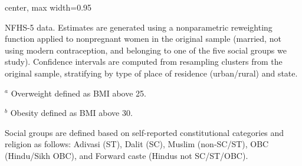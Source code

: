 \documentclass[12pt]{article}
\begin{document}
\newpage
\begin{landscape}
\begin{table}[!htbp]
\centering
\begin{adjustbox}{center, max width=0.95\linewidth} %
\begin{threeparttable}
    \small
    \caption{: Means and 95\% CIs for additional maternal nutrition indicators by social group}
    \label{tab:addnut}

    \setlength{\tabcolsep}{2pt}
    \renewcommand{\arraystretch}{1.35}

    

    \begin{tablenotes}
        \item NFHS-5 data. Estimates are generated using a nonparametric reweighting function applied to nonpregnant women in the original sample (married, not using modern contraception, and belonging to one of the five social groups we study). Confidence intervals are computed from resampling clusters from the original sample, stratifying by type of place of residence (urban/rural) and state.
        \item $^{a}$ Overweight defined as BMI above 25.
        \item $^{b}$ Obesity defined as BMI above 30.
        \item Social groups are defined based on self-reported constitutional categories and religion as follows: Adivasi (ST), Dalit (SC), Muslim  (non‐SC/ST), OBC (Hindu/Sikh OBC), and Forward caste (Hindus not SC/ST/OBC).
    \end{tablenotes}

\end{threeparttable}
\end{adjustbox}
\end{table}
\end{landscape}
\end{document}
